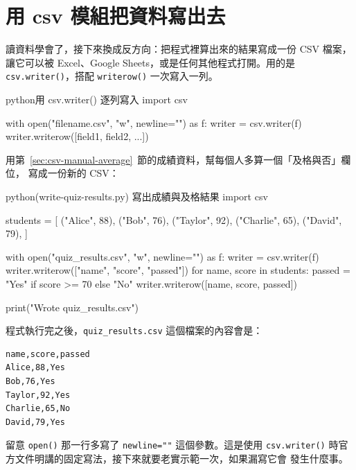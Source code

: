 
\section{用 csv 模組把資料寫出去}
\label{sec:csv-module-write}

讀資料學會了，接下來換成反方向：把程式裡算出來的結果寫成一份 CSV 檔案，讓它可以被
Excel、Google Sheets，或是任何其他程式打開。用的是 \texttt{csv.writer()}，搭配
\texttt{writerow()} 一次寫入一列。

\begin{code}{python}{用 csv.writer() 逐列寫入}
import csv

with open("filename.csv", "w", newline="") as f:
    writer = csv.writer(f)
    writer.writerow([field1, field2, ...])
\end{code}

用第~\ref{sec:csv-manual-average}~節的成績資料，幫每個人多算一個「及格與否」欄位，
寫成一份新的 CSV：

\begin{example}{python}{(write-quiz-results.py) 寫出成績與及格結果}
import csv

students = [
    ("Alice", 88),
    ("Bob", 76),
    ("Taylor", 92),
    ("Charlie", 65),
    ("David", 79),
]

with open("quiz_results.csv", "w", newline="") as f:
    writer = csv.writer(f)
    writer.writerow(["name", "score", "passed"])
    for name, score in students:
        passed = "Yes" if score >= 70 else "No"
        writer.writerow([name, score, passed])

print("Wrote quiz_results.csv")
\end{example}


程式執行完之後，\texttt{quiz\_results.csv} 這個檔案的內容會是：

\begin{verbatim}
name,score,passed
Alice,88,Yes
Bob,76,Yes
Taylor,92,Yes
Charlie,65,No
David,79,Yes
\end{verbatim}

留意 \texttt{open()} 那一行多寫了 \texttt{newline=""} 這個參數。這是使用
\texttt{csv.writer()} 時官方文件明講的固定寫法，接下來就要老實示範一次，如果漏寫它會
發生什麼事。

